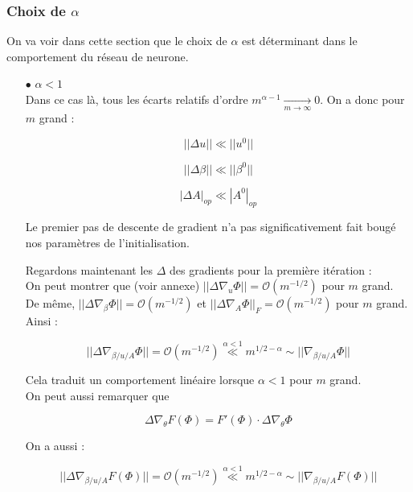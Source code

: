 \documentclass[a4paper, 11pt, french]{article}
\theoremstyle{definition}
\begin{document}
	\subsubsection{Choix de $\alpha$}
	
	On va voir dans cette section que le choix de $\alpha$ est déterminant dans le comportement du réseau de neurone.\\
	
	\begin{itemize}
		\item[$\bullet$] $\alpha < 1$ \\
		
		Dans ce cas là, tous les écarts relatifs d'ordre $m^{\alpha - 1} \xrightarrow[m \to \infty]{} 0$. On a donc pour $m$ grand :
		
		\[||\Delta u|| \ll ||u^0||\]
		
		\[||\Delta \beta|| \ll ||\beta^0||\]
		
		\[|\Delta A|_{op} \ll |A^0|_{op}\]
		
		Le premier pas de descente de gradient n'a pas significativement fait bougé nos paramètres de l'initialisation.

		Regardons maintenant les $\Delta$ des gradients pour la première itération :\\

	On peut montrer que (voir annexe) $||\Delta \nabla_u \Phi|| = \mathcal{O}(m^{-1/2})$ pour $m$ grand. \\
	
	De même, $||\Delta \nabla_{\beta} \Phi|| = \mathcal{O}(m^{-1/2})$ et $||\Delta \nabla_{A} \Phi||_F = \mathcal{O}(m^{-1/2})$ pour $m$ grand. \\
	
	Ainsi :
	
	\[||\Delta \nabla_{\beta / u / A} \Phi|| = \mathcal{O}(m^{-1/2}) \stackrel{\alpha < 1}{\ll} m^{1/2 - \alpha} \sim ||\nabla_{\beta / u / A} \Phi||\]
	
	Cela traduit un comportement linéaire lorsque $\alpha < 1$ pour $m$ grand. \\
	
	On peut aussi remarquer que
	
	\[\Delta \nabla_{\theta} F(\Phi) =  F'(\Phi) \cdot \Delta \nabla_{\theta} \Phi \]
	
	On a aussi :

	\[||\Delta \nabla_{\beta / u / A} F(\Phi) || = \mathcal{O}(m^{-1/2}) \stackrel{\alpha < 1}{\ll} m^{1/2 - \alpha} \sim ||\nabla_{\beta / u / A} F(\Phi)||\]


\end{itemize}
\end{document}
